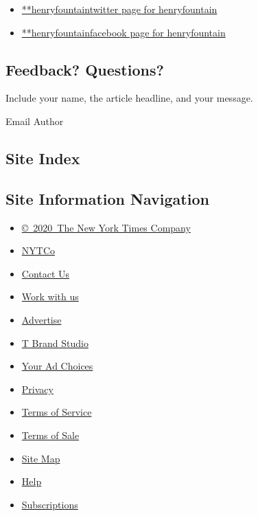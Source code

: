 \begin{itemize}
\tightlist
\item
  \href{https://twitter.com/henryfountain}{**henryfountaintwitter page
  for henryfountain}
\item
  \href{https://www.facebook.com/henryfountain}{**henryfountainfacebook
  page for henryfountain}
\end{itemize}

\hypertarget{feedback-questions}{%
\subsection{Feedback? Questions?}\label{feedback-questions}}

Include your name, the article headline, and your message.

Email Author

\hypertarget{site-index}{%
\subsection{Site Index}\label{site-index}}

\hypertarget{site-information-navigation}{%
\subsection{Site Information
Navigation}\label{site-information-navigation}}

\begin{itemize}
\tightlist
\item
  \href{https://help.nytimes.com/hc/en-us/articles/115014792127-Copyright-notice}{©~2020~The
  New York Times Company}
\end{itemize}

\begin{itemize}
\tightlist
\item
  \href{https://www.nytco.com/}{NYTCo}
\item
  \href{https://help.nytimes.com/hc/en-us/articles/115015385887-Contact-Us}{Contact
  Us}
\item
  \href{https://www.nytco.com/careers/}{Work with us}
\item
  \href{https://nytmediakit.com/}{Advertise}
\item
  \href{http://www.tbrandstudio.com/}{T Brand Studio}
\item
  \href{https://www.nytimes.com/privacy/cookie-policy\#how-do-i-manage-trackers}{Your
  Ad Choices}
\item
  \href{https://www.nytimes.com/privacy}{Privacy}
\item
  \href{https://help.nytimes.com/hc/en-us/articles/115014893428-Terms-of-service}{Terms
  of Service}
\item
  \href{https://help.nytimes.com/hc/en-us/articles/115014893968-Terms-of-sale}{Terms
  of Sale}
\item
  \href{https://spiderbites.nytimes.com}{Site Map}
\item
  \href{https://help.nytimes.com/hc/en-us}{Help}
\item
  \href{https://www.nytimes.com/subscription?campaignId=37WXW}{Subscriptions}
\end{itemize}
